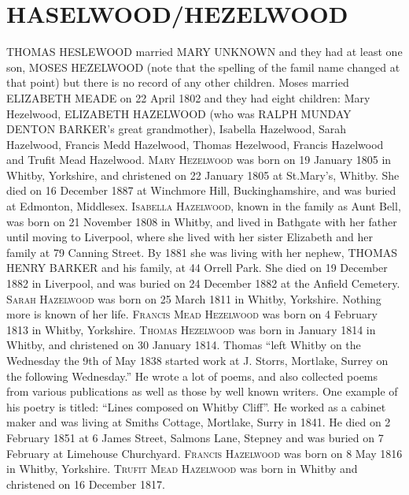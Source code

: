 \section{HASELWOOD/HEZELWOOD}

\uppercase{Thomas Heslewood} married \uppercase{Mary Unknown} and they had at least one son, \uppercase{Moses Hezelwood} (note that the spelling of the famil name changed at that point) but there is no record of any other children.  Moses married \uppercase{Elizabeth Meade} on 22 April 1802 and they had eight children: Mary Hezelwood, \uppercase{Elizabeth Hazelwood} (who was \uppercase{Ralph Munday Denton Barker}'s great grandmother), Isabella Hazelwood, Sarah Hazelwood, Francis Medd Hazelwood, Thomas Hezelwood, Francis Hazelwood and Trufit Mead Hazelwood. 
\textsc{Mary Hezelwood} was born on 19 January 1805 in Whitby, Yorkshire, and christened on 22 January 1805 at St.Mary's,	Whitby. She died on 16 December 1887 at Winchmore Hill, Buckinghamshire, and was buried at Edmonton, Middlesex.
\textsc{Isabella Hazelwood}, known in the family as Aunt Bell, was born on 21 November 1808 in Whitby, and lived in Bathgate with her father until moving to Liverpool, where she lived with her sister Elizabeth and her family at 79 Canning Street. By 1881 she was living with her nephew, \uppercase{Thomas Henry Barker} and his family, at 44 Orrell Park.  She died on 19 December 1882 in Liverpool, and was buried on 24 December 1882 at the Anfield Cemetery. 	
\textsc{Sarah Hazelwood} was born on 25 March 1811 in	Whitby, Yorkshire. Nothing more is known of her life.
\textsc{Francis Mead Hezelwood} was born on 4 February 1813 in Whitby, Yorkshire.
\textsc{Thomas Hezelwood} was born in January 1814 in	Whitby, and christened on 30 January 1814.  Thomas ``left Whitby on the Wednesday the 9th of May 1838 started work at J. Storrs, Mortlake, Surrey on the following Wednesday.'' He wrote a lot of poems, and also collected poems from various publications as well as those by well known writers. One example of his poetry is titled: ``Lines composed on Whitby Cliff''.  He worked as a cabinet maker and was living at Smiths Cottage, Mortlake, Surry in 1841. He died on 2 February 1851 at 6 James Street, Salmons Lane, Stepney and was buried on 7 February at Limehouse Churchyard.
\textsc{Francis Hazelwood} was born on 8 May 1816 in Whitby, Yorkshire.
\textsc{Trufit Mead Hazelwood} was born in Whitby and christened on 16 December 1817.


